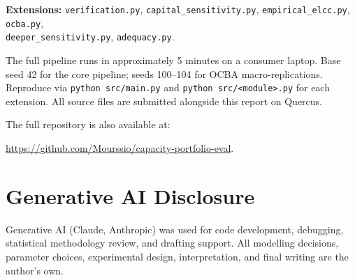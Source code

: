 \documentclass[11pt]{article}
\begin{document}
\noindent\textbf{Extensions:} \texttt{verification.py}, \texttt{capital\_sensitivity.py}, \texttt{empirical\_elcc.py}, \texttt{ocba.py},\\ \texttt{deeper\_sensitivity.py}, \texttt{adequacy.py}.

The full pipeline runs in approximately 5 minutes on a consumer laptop. Base seed 42 for the core pipeline; seeds 100--104 for OCBA macro-replications. Reproduce via \texttt{python src/main.py} and \texttt{python src/<module>.py} for each extension. All source files are submitted alongside this report on Quercus. 

\vspace{0.5em}
\noindent The full repository is also available at:
\par\noindent\url{https://github.com/Mourssio/capacity-portfolio-eval}.

\section{Generative AI Disclosure}\label{app:ai}

Generative AI (Claude, Anthropic) was used for code development, debugging, statistical methodology review, and drafting support. All modelling decisions, parameter choices, experimental design, interpretation, and final writing are the author's own.
\end{document}

